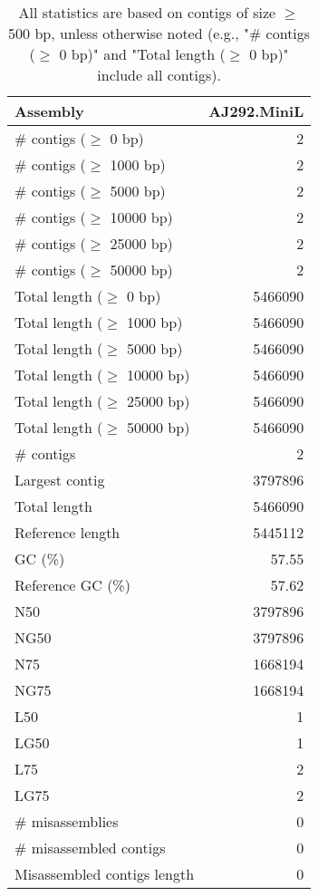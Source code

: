 \documentclass[12pt,a4paper]{article}
\begin{document}
\begin{table}[ht]
\begin{center}
\caption{All statistics are based on contigs of size $\geq$ 500 bp, unless otherwise noted (e.g., "\# contigs ($\geq$ 0 bp)" and "Total length ($\geq$ 0 bp)" include all contigs).}
\begin{tabular}{|l*{1}{|r}|}
\hline
Assembly & AJ292.MiniL \\ \hline
\# contigs ($\geq$ 0 bp) & 2 \\ \hline
\# contigs ($\geq$ 1000 bp) & 2 \\ \hline
\# contigs ($\geq$ 5000 bp) & 2 \\ \hline
\# contigs ($\geq$ 10000 bp) & 2 \\ \hline
\# contigs ($\geq$ 25000 bp) & 2 \\ \hline
\# contigs ($\geq$ 50000 bp) & 2 \\ \hline
Total length ($\geq$ 0 bp) & 5466090 \\ \hline
Total length ($\geq$ 1000 bp) & 5466090 \\ \hline
Total length ($\geq$ 5000 bp) & 5466090 \\ \hline
Total length ($\geq$ 10000 bp) & 5466090 \\ \hline
Total length ($\geq$ 25000 bp) & 5466090 \\ \hline
Total length ($\geq$ 50000 bp) & 5466090 \\ \hline
\# contigs & 2 \\ \hline
Largest contig & 3797896 \\ \hline
Total length & 5466090 \\ \hline
Reference length & 5445112 \\ \hline
GC (\%) & 57.55 \\ \hline
Reference GC (\%) & 57.62 \\ \hline
N50 & 3797896 \\ \hline
NG50 & 3797896 \\ \hline
N75 & 1668194 \\ \hline
NG75 & 1668194 \\ \hline
L50 & 1 \\ \hline
LG50 & 1 \\ \hline
L75 & 2 \\ \hline
LG75 & 2 \\ \hline
\# misassemblies & 0 \\ \hline
\# misassembled contigs & 0 \\ \hline
Misassembled contigs length & 0 \\ \hline

\end{tabular}
\end{center}
\end{table}
\end{document}
